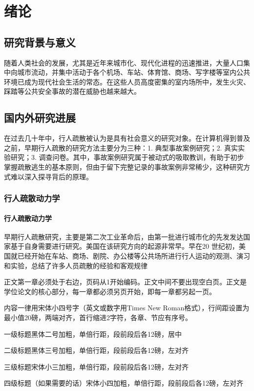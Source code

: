 
\chapter{绪论}

\label{sec:ch1}

\section{研究背景与意义}

随着人类社会的发展，尤其是近年来城市化、现代化进程的迅速推进，大量人口集中向城市流动，并集中活动于各个机场、车站、体育馆、商场、写字楼等室内公共环境已成为现代社会生活的常态。在这些人员高度密集的室内场所中，发生火灾、踩踏等公共安全事故的潜在威胁也越来越大。

\section{国内外研究进展}

在过去几十年中，行人疏散被认为是具有社会意义的研究对象。在计算机得到普及之前，早期行人疏散的研究方法主要分为三种：1. 典型事故案例研究；2. 真实实验研究；3. 调查问卷。其中，事故案例研究属于被动式的吸取教训，有助于初步掌握疏散逃生的基本原则，但由于留下完整记录的事故案例非常稀少，这种研究方式难以深入探寻背后的原理。

\subsection{行人疏散动力学}

\subsubsection{行人疏散动力学}

早期行人疏散研究，主要是第二次工业革命后，由第一批进行城市化的先发发达国家基于自身需要进行研究。美国在该研究方向的起源非常早。早在20 世纪初，美国就已经开始在车站、商场、剧院、办公楼等公共场所进行行人运动的观测、演习和实验，总结了许多人员疏散的经验和客观规律 \\ 

{\color{red}正文第一章必须处于右边，页码从1开始编码。正文中间不要出现空白页。正文是学位论文的核心部分，每一章都必须另页开始，即每一章都另起一页。

内容一律用宋体小四号字（英文或数字用Times New Roman格式），行间距设置为最小值20磅，两端对齐，首行缩进2字符，各章、节应有序号。

一级标题黑体二号加粗，单倍行距，段前段后各12磅，居中

二级标题黑体三号加粗，单倍行距，段前段后各12磅，左对齐

三级标题宋体小三加粗，单倍行距，段前段后各12磅，左对齐

四级标题（如果需要的话）宋体小四加粗，单倍行距，段前段后各12磅，左对齐}

